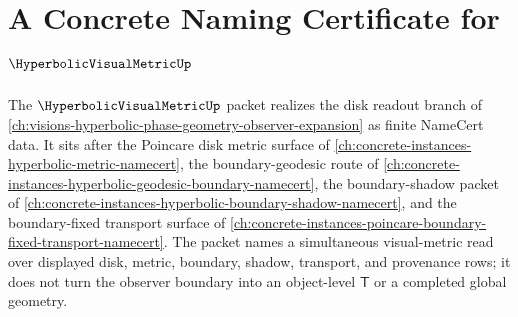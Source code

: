 \chapter{A Concrete Naming Certificate for $\HyperbolicVisualMetricUp$}
\label{ch:concrete-instances-hyperbolic-visual-metric-namecert}

The $\HyperbolicVisualMetricUp$ packet realizes the disk readout branch of \autoref{ch:visions-hyperbolic-phase-geometry-observer-expansion} as finite NameCert data. It sits after the Poincare disk metric surface of \autoref{ch:concrete-instances-hyperbolic-metric-namecert}, the boundary-geodesic route of \autoref{ch:concrete-instances-hyperbolic-geodesic-boundary-namecert}, the boundary-shadow packet of \autoref{ch:concrete-instances-hyperbolic-boundary-shadow-namecert}, and the boundary-fixed transport surface of \autoref{ch:concrete-instances-poincare-boundary-fixed-transport-namecert}. The packet names a simultaneous visual-metric read over displayed disk, metric, boundary, shadow, transport, and provenance rows; it does not turn the observer boundary into an object-level $\mathsf{T}$ or a completed global geometry.

